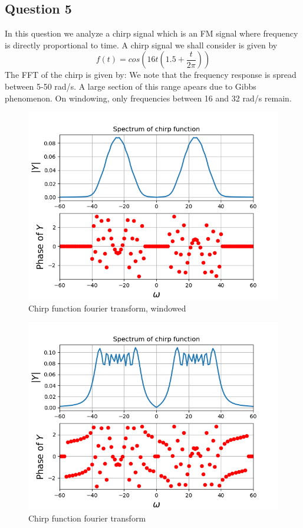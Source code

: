 \documentclass[11pt, a4paper]{article}
\begin{document}
\subsection{Question 5}
In this question we analyze a chirp signal which is an FM signal where frequency is directly proportional to time.
A chirp signal we shall consider is given by 
\begin{equation}
    f(t) = cos(16t(1.5 + \frac{t}{2\pi}))
\end{equation}
The FFT of the chirp is given by:
We note that the frequency response is spread between 5-50 rad/s. A large section of this range apears due to Gibbs phenomenon. On windowing, only frequencies between 16 and 32 rad/s remain.
\begin{figure}[h!]
\centering
\includegraphics[scale=0.6]{fig11.png}
\caption{Chirp function fourier transform, windowed}
\label{fig:universe}
\end{figure}
\begin{figure}[h!]
\centering
\includegraphics[scale=0.6]{fig12.png}
\caption{Chirp function fourier transform}
\label{fig:universe}
\end{figure}
\newpage
\end{document}
